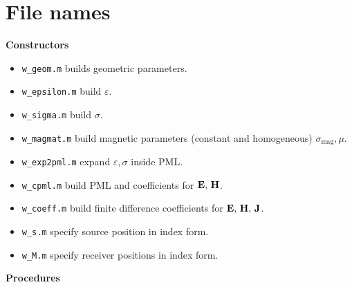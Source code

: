 \documentclass[a4paper,12pt]{article}
\begin{document}
\section{File names}
{\bf Constructors}
\begin{itemize}
\item \texttt{w\_geom.m} builds geometric parameters.
\item \texttt{w\_epsilon.m} build $\varepsilon$.
\item \texttt{w\_sigma.m} build $\sigma$.
\item \texttt{w\_magmat.m} build magnetic parameters (constant and homogeneous) 
$\sigma_{\text{mag}},\mu$.
\item \texttt{w\_exp2pml.m} expand $\varepsilon,\sigma$ inside PML.
\item \texttt{w\_cpml.m} build PML and coefficients for ${\bf E,\, H}$.
\item \texttt{w\_coeff.m} build finite difference coefficients for ${\bf E,\, H,\, J}$.
\item \texttt{w\_s.m} specify source position in index form.
\item \texttt{w\_M.m} specify receiver positions in index form.
\end{itemize}
{\bf Procedures}
\end{document}
